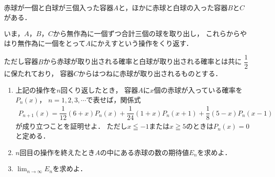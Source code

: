 \documentclass[../../main.tex]{subfiles}
\begin{document}
赤球が一個と白球が三個入った容器$A$と，ほかに赤球と白球の入った容器$B$と$C$がある．

いま，$A$，$B$，$C$から無作為に一個ずつ合計三個の球を取り出し，
これらからやはり無作為に一個をとって$A$にかえすという操作をくり返す．

ただし容器$B$から赤球が取り出される確率と白球が取り出される確率とは共に
$\displaystyle\dfrac{1}{2}$に保たれており，
容器$C$からはつねに赤球が取り出されるものとする．
\begin{enumerate}
  \item 上記の操作を$n$回くり返したとき，
    容器$A$に$x$個の赤球が入っている確率を$P_n(x)$，
    $n=1,2,3,\cdots$で表せば，関係式
    \begin{align*}
      P_{n+1}(x)=\dfrac{1}{12}(6+x)P_n(x)+\dfrac{1}{24}(1+x)P_n(x+1)+\dfrac{1}{8}(5-x)P_n(x-1)
    \end{align*}
    が成り立つことを証明せよ．
    ただし$x \leqq -1$または$x \geqq 5$のときは$P_n(x)=0$と定める．
  \item $n$回目の操作を終えたとき$A$の中にある赤球の数の期待値$E_n$を求めよ．
  \item $\displaystyle\lim_{n\to\infty}E_n$を求めよ．
\end{enumerate}
\end{document}
